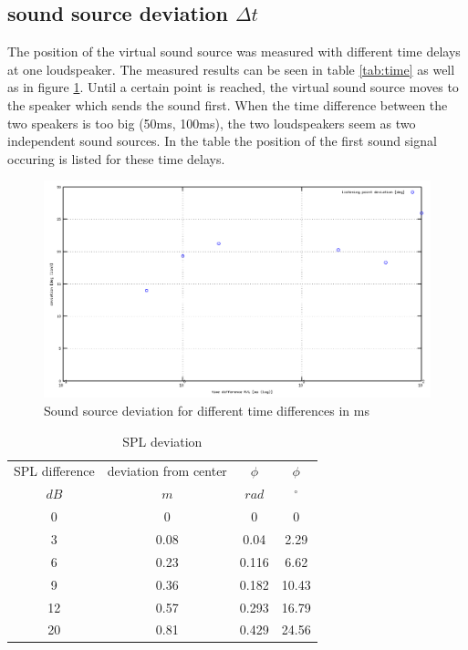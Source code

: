 \documentclass{article}
\begin{document}
\subsection{sound source deviation $\Delta t$}
The position of the virtual sound source was measured with different time delays at one loudspeaker. The measured results can be seen in table \ref{tab:time} as well as in figure \ref{fig:timedelay}. Until a certain point is reached, the virtual sound source moves to the speaker which sends the sound first. When the time difference between the two speakers is too big (50ms, 100ms), the two loudspeakers seem as two independent sound sources. In the table the position of the first sound signal occuring is listed for these time delays. 
\begin{figure}[htbp]
\begin{center}
\includegraphics[width=15cm,keepaspectratio=true]{timedifference}
\caption{Sound source deviation for different time differences in ms}
\label{fig:timedelay}
\end{center}
\end{figure}

\begin{table}
\begin{center}
\begin{tabular}{|c||c||c|c|}
\hline
SPL difference & deviation from center & $\phi$ & $\phi$ \\
$dB$	&	$m$	&	$rad$	&	$^\circ$		\\
\hline
\hline
0 & 0 & 0 & 0\\
\hline
3 & 0.08 & 0.04 & 2.29 \\
\hline
6 & 0.23 & 0.116 & 6.62\\
\hline
9 & 0.36 & 0.182 & 10.43\\
\hline
12 & 0.57 & 0.293 & 16.79\\
\hline
20 & 0.81 & 0.429 & 24.56\\
\hline
\end{tabular}
\caption{SPL deviation}
\label{tab:SPL}
\end{center}
\end{table}
\end{document}
